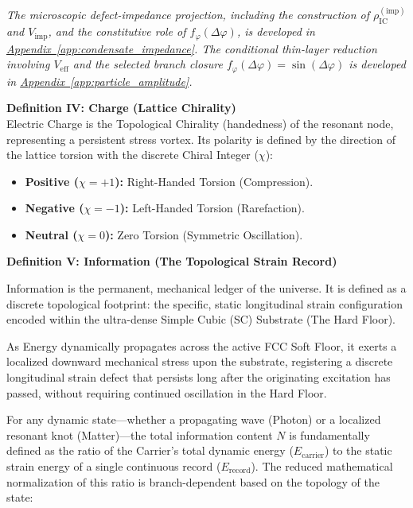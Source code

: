 \begin{minipage}{\textwidth}
\vspace{0.5em}
\noindent\textit{The microscopic defect-impedance projection, including the construction of $\rho_{\mathrm{IC}}^{(\mathrm{imp})}$ and $V_{\mathrm{imp}}$, and the constitutive role of $f_{\varphi}(\Delta\varphi)$, is developed in \hyperref[app:condensate_impedance]{Appendix~\ref*{app:condensate_impedance}}. The conditional thin-layer reduction involving $V_{\mathrm{eff}}$ and the selected branch closure $f_{\varphi}(\Delta\varphi)=\sin(\Delta\varphi)$ is developed in \hyperref[app:particle_amplitude]{Appendix~\ref*{app:particle_amplitude}}.}
\end{minipage}
\vspace{0.5em}

\vspace{0.5em}
\noindent\textbf{Definition IV: Charge (Lattice Chirality)}\\
\label{def:definition_four}
Electric Charge is the Topological Chirality (handedness) of the resonant node, representing a persistent stress vortex. Its polarity is defined by the direction of the lattice torsion with the discrete Chiral Integer ($\chi$):
\begin{itemize}
    \item \textbf{Positive ($\chi = +1$):} Right-Handed Torsion (Compression).
    \item \textbf{Negative ($\chi = -1$):} Left-Handed Torsion (Rarefaction).
    \item \textbf{Neutral ($\chi = 0$):} Zero Torsion (Symmetric Oscillation).
\end{itemize}

\vspace{0.5em}
\noindent \textbf{Definition V: Information (The Topological Strain Record)}\\
\label{def:definition_five}

Information is the permanent, mechanical ledger of the universe. It is defined as a discrete topological footprint: the specific, static longitudinal strain configuration encoded within the ultra-dense Simple Cubic (SC) Substrate (The Hard Floor).

As Energy dynamically propagates across the active FCC Soft Floor, it exerts a localized downward mechanical stress upon the substrate, registering a discrete longitudinal strain defect that persists long after the originating excitation has passed, without requiring continued oscillation in the Hard Floor.

For any dynamic state---whether a propagating wave (Photon) or a localized resonant knot (Matter)---the total information content $N$ is fundamentally defined as the ratio of the Carrier's total dynamic energy ($E_{\mathrm{carrier}}$) to the static strain energy of a single continuous record ($E_{\mathrm{record}}$). The reduced mathematical normalization of this ratio is branch-dependent based on the topology of the state:

